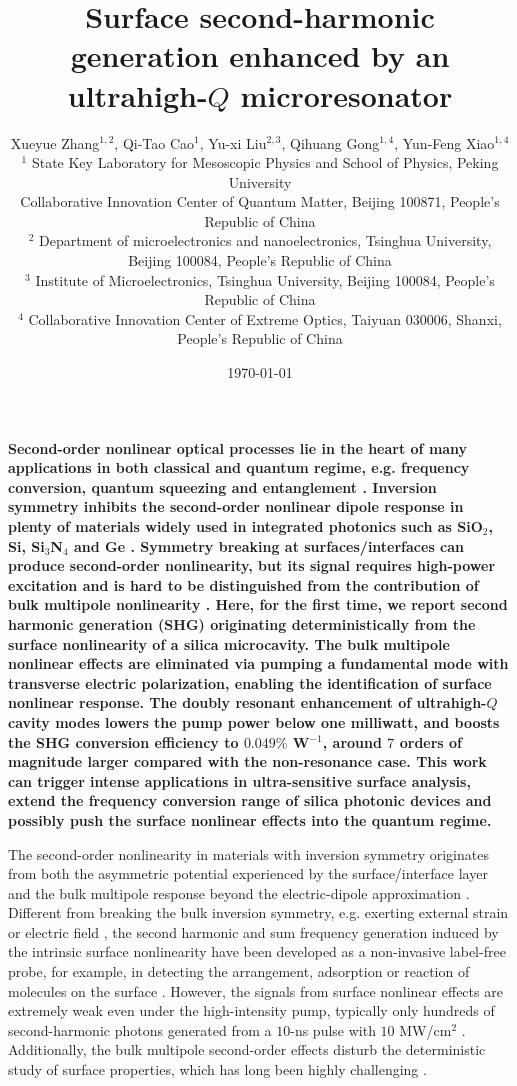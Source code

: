 \documentclass[a4paper,8pt,hyperref, twocolumn]{article}
\title{\bfseries \Large 
Surface second-harmonic generation enhanced by an ultrahigh-$Q$ microresonator
}
\author{\normalsize  Xueyue Zhang$^{1,2}$, Qi-Tao Cao$^{1}$, Yu-xi Liu$^{2,3}$, Qihuang Gong$^{1,4}$, Yun-Feng Xiao$^{1,4}$ \\
\normalsize $^1$ State Key Laboratory for Mesoscopic Physics and School of Physics, Peking University \\
\normalsize Collaborative Innovation Center of Quantum Matter, Beijing 100871, People's Republic of China \\
\normalsize $^2$ Department of microelectronics and nanoelectronics, Tsinghua University, Beijing 100084, People’s Republic of China \\
\normalsize $^3$ Institute of Microelectronics, Tsinghua University, Beijing 100084, People’s Republic of China \\
\normalsize $^4$ Collaborative Innovation Center of Extreme Optics, Taiyuan 030006, Shanxi, People’s Republic of China
}
\date{\normalsize \today}
\begin{document}
\maketitle


\textbf{
Second-order nonlinear optical processes lie in the heart of many applications in both classical and quantum regime, e.g. frequency conversion,  quantum squeezing \cite{lugiato1983squeezed} and entanglement \cite{kwiat1995new}. 
Inversion symmetry inhibits the second-order nonlinear dipole response in plenty of materials widely used in integrated photonics such as SiO$_2$, Si, Si$_3$N$_4$ and Ge \cite{boyd2003nonlinear, leuthold2010nonlinear, moss2013new}.
Symmetry breaking at surfaces/interfaces can produce second-order nonlinearity, but its signal requires high-power excitation and is hard to be distinguished from the contribution of bulk multipole nonlinearity \cite{shen1989surface, heinz1991second}. 
Here, for the first time, we report second harmonic generation (SHG) originating deterministically from the surface nonlinearity of a silica microcavity.
The bulk multipole nonlinear effects are eliminated via pumping a fundamental mode with transverse electric polarization, enabling the identification of surface nonlinear response.
The doubly resonant enhancement of ultrahigh-$Q$ cavity modes lowers the pump power below one milliwatt, and boosts the SHG conversion efficiency to $0.049\%$ W$^{-1}$, around $7$ orders of magnitude larger compared with the non-resonance case. 
This work can trigger intense applications in ultra-sensitive surface analysis, extend the frequency conversion range of silica photonic devices and possibly push the surface nonlinear effects into the quantum regime.
}

The second-order nonlinearity in materials with inversion symmetry originates from both the asymmetric potential experienced by the surface/interface layer and the bulk multipole response beyond the electric-dipole approximation \cite{shen1989surface, heinz1991second}. 
Different from breaking the bulk inversion symmetry, e.g. exerting external strain \cite{jacobsen2006strained, cazzanelli2012second} or electric field \cite{timurdogan2017electric}, the second harmonic and sum frequency generation induced by the intrinsic surface nonlinearity have been developed as a non-invasive label-free probe, for example, in detecting the arrangement,  adsorption or reaction of molecules on the surface \cite{shen1989surface, heinz1983determination, corn1994optical, sun2015surface, tian2014recent}.  
However, the signals from surface nonlinear effects are extremely weak even under the high-intensity pump, typically only hundreds of second-harmonic photons generated from a $10$-ns pulse with $10$ MW/cm$^{2}$ \cite{shen1989surface}. 
Additionally, the bulk multipole second-order effects disturb the deterministic study of surface properties, which has long been highly challenging \cite{tian2014recent, heinz1991second}.
\end{document}

